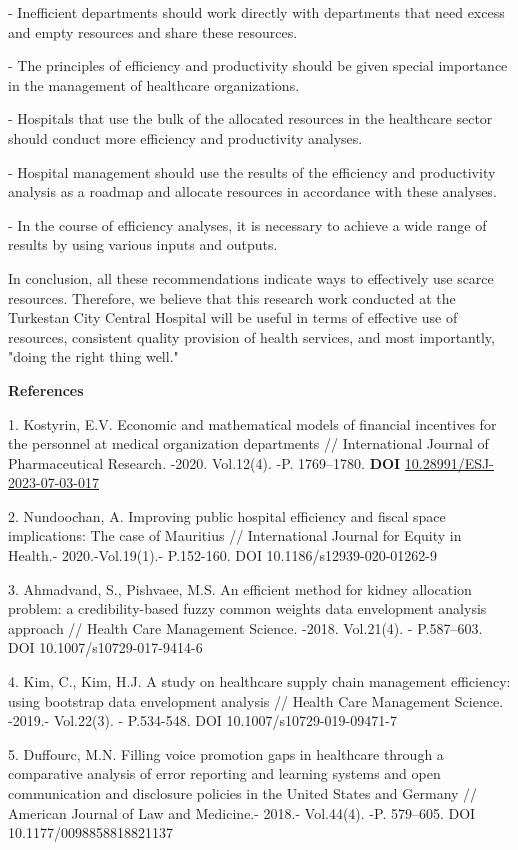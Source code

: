 - Inefficient departments should work directly with departments that
need excess and empty resources and share these resources.

- The principles of efficiency and productivity should be given special
importance in the management of healthcare organizations.

- Hospitals that use the bulk of the allocated resources in the
healthcare sector should conduct more efficiency and productivity
analyses.

- Hospital management should use the results of the efficiency and
productivity analysis as a roadmap and allocate resources in accordance
with these analyses.

- In the course of efficiency analyses, it is necessary to achieve a
wide range of results by using various inputs and outputs.

In conclusion, all these recommendations indicate ways to effectively
use scarce resources. Therefore, we believe that this research work
conducted at the Turkestan City Central Hospital will be useful in terms
of effective use of resources, consistent quality provision of health
services, and most importantly, "doing the right thing well."

{\bfseries References}

1. Kostyrin, E.V. Economic and mathematical models of financial
incentives for the personnel at medical organization departments //
International Journal of Pharmaceutical Research. -2020. Vol.12(4). -P.
1769--1780. {\bfseries DOI}
\href{https://doi.org/10.28991/ESJ-2023-07-03-017}{10.28991/ESJ-2023-07-03-017}

2. Nundoochan, A. Improving public hospital efficiency and fiscal space
implications: The case of Mauritius // International Journal for Equity
in Health.- 2020.-Vol.19(1).- P.152-160. DOI 10.1186/s12939-020-01262-9

3. Ahmadvand, S., Pishvaee, M.S. An efficient method for kidney
allocation problem: a credibility-based fuzzy common weights data
envelopment analysis approach // Health Care Management Science. -2018.
Vol.21(4). - P.587--603. DOI 10.1007/s10729-017-9414-6

4. Kim, C., Kim, H.J. A study on healthcare supply chain management
efficiency: using bootstrap data envelopment analysis // Health Care
Management Science. -2019.- Vol.22(3). - P.534-548. DOI
10.1007/s10729-019-09471-7

5. Duffourc, M.N. Filling voice promotion gaps in healthcare through a
comparative analysis of error reporting and learning systems and open
communication and disclosure policies in the United States and Germany
// American Journal of Law and Medicine.- 2018.- Vol.44(4). -P.
579--605. DOI 10.1177/0098858818821137

